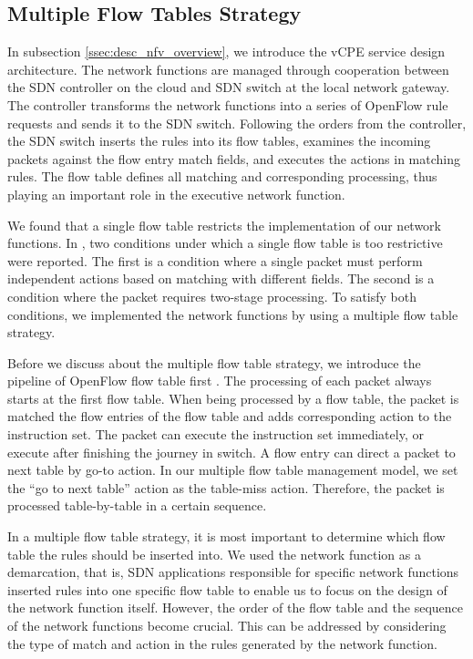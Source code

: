 \documentclass[conference]{IEEEtran}
\begin{document}
\subsection{Multiple Flow Tables Strategy}
In subsection \ref{ssec:desc_nfv_overview}, we introduce the vCPE service design architecture. The network functions are managed through cooperation between the SDN controller on the cloud and SDN switch at the local network gateway. The controller transforms the network functions into a series of OpenFlow rule requests and sends it to the SDN switch. Following the orders from the controller, the SDN switch inserts the rules into its flow tables, examines the incoming packets against the flow entry match fields, and executes the actions in matching rules. The flow table \cite{sdn-ft} defines all matching and corresponding processing, thus playing an important role in the executive network function.

We found that a single flow table restricts the implementation of our network functions. In \cite{onf-multi-tables}, two conditions under which a single flow table is too restrictive were reported. The first is a condition where a single packet must perform independent actions based on matching with different fields. The second is a condition where the packet requires two-stage processing. To satisfy both conditions, we implemented the network functions by using a multiple flow table strategy.

Before we discuss about the multiple flow table strategy, we introduce the pipeline of OpenFlow flow table first \cite{sp:openflow13}. The processing of each packet always starts at the first flow table. When being processed by a flow table, the packet is matched the flow entries of the flow table and adds corresponding action to the instruction set. The packet can execute the instruction set immediately, or execute after finishing the journey in switch. A flow entry can direct a packet to next table by go-to action. In our multiple flow table management model, we set the ``go to next table'' action as the table-miss action. Therefore, the packet is processed table-by-table in a certain sequence.

In a multiple flow table strategy, it is most important to determine which flow table the rules should be inserted into. We used the network function as a demarcation, that is, SDN applications responsible for specific network functions inserted rules into one specific flow table to enable us to focus on the design of the network function itself. However, the order of the flow table and the sequence of the network functions become crucial. This can be addressed by considering the type of match and action in the rules generated by the network function.
\end{document}
